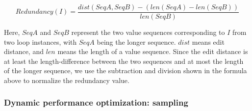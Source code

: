 
\[
{
	Redundancy(I) =  \frac{dist(SeqA,SeqB) - (len(SeqA) - len(SeqB))}{len(SeqB)}
}
\]

Here, $SeqA$ and $SeqB$ represent the two value sequences corresponding to $I$
from two loop instances, with $SeqA$ being the longer sequence.
$dist$ means edit distance, and $len$ means the length of a value sequence.
Since the edit distance is at least the length-difference between the
two sequences and at most the length of the longer sequence, we use the 
subtraction and division shown in the formula above to normalize the
redundancy value.




\subsubsection{Dynamic performance optimization: sampling}
\label{sec:6_inst}

